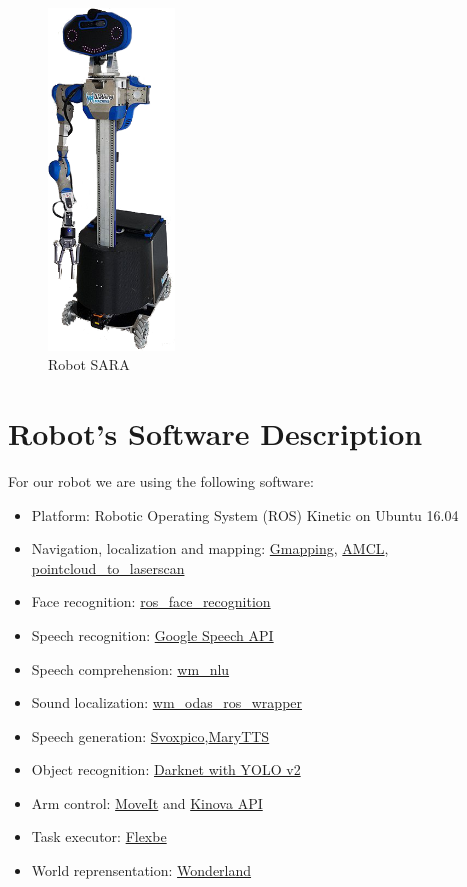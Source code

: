 \begin{figure}
	\centering
	\includegraphics[width=0.30\textwidth]{images/sara_2.png}
	\caption{Robot SARA}
\end{figure}
\section*{Robot's Software Description}

For our robot we are using the following software:

\begin{itemize}
	\item Platform: Robotic Operating System (ROS) Kinetic on Ubuntu 16.04
	\item Navigation, localization and mapping: \href{http://wiki.ros.org/gmapping}{Gmapping}, \href{http://wiki.ros.org/amcl}{AMCL}, \href{http://wiki.ros.org/pointcloud_to_laserscan}{pointcloud\_to\_laserscan}
	\item Face recognition: \href{http:/github.com/walkingmachine/ros\_face\_recognition}{ros\_face\_recognition}
	\item Speech recognition: \href{https://github.com/WalkingMachine/lab\_ros\_speech\_to_text}{Google Speech API}
	\item Speech comprehension: \href{https://github.com/WalkingMachine/wm\_nlu}{wm\_nlu}
	\item Sound localization: \href{https://github.com/WalkingMachine/wm\_odas\_ros\_wrapper}{wm\_odas\_ros\_wrapper}
	\item Speech generation: \href{https://doc.ubuntu-fr.org/svoxpico}{Svoxpico},\href{https://github.com/marytts/marytts}{MaryTTS}
	\item Object recognition: \href{https://github.com/WalkingMachine/wm_darknet}{Darknet with YOLO v2 }
	\item Arm control: \href{http://wiki.ros.org/moveit}{MoveIt} and \href{https://github.com/Kinovarobotics/kinova-ros}{Kinova API}
	\item Task executor: \href{http://wiki.ros.org/flexbe}{Flexbe} 
	\item World reprensentation: \href{http://github.com/walkingmachine/wonderland}{Wonderland}
\end{itemize}